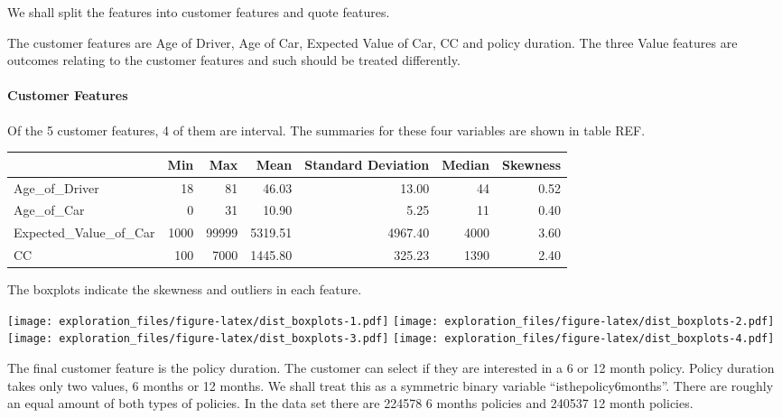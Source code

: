 

% 



We shall split the features into customer features and quote features.

The customer features are Age of Driver, Age of Car, Expected Value of
Car, CC and policy duration. The three Value features are outcomes
relating to the customer features and such should be treated
differently.

\paragraph{Customer Features}\label{customer-features}

Of the 5 customer features, 4 of them are interval. The summaries for
these four variables are shown in table REF.

\begin{longtable}[c]{@{}lrrrrrr@{}}
\toprule
& Min & Max & Mean & Standard Deviation & Median &
Skewness\tabularnewline
\midrule
\endhead
Age\_of\_Driver & 18 & 81 & 46.03 & 13.00 & 44 & 0.52\tabularnewline
Age\_of\_Car & 0 & 31 & 10.90 & 5.25 & 11 & 0.40\tabularnewline
Expected\_Value\_of\_Car & 1000 & 99999 & 5319.51 & 4967.40 & 4000 &
3.60\tabularnewline
CC & 100 & 7000 & 1445.80 & 325.23 & 1390 & 2.40\tabularnewline
\bottomrule
\end{longtable}

The boxplots indicate the skewness and outliers in each feature.

\texttt{[image: exploration\_files/figure-latex/dist\_boxplots-1.pdf]}
\texttt{[image: exploration\_files/figure-latex/dist\_boxplots-2.pdf]}
\texttt{[image: exploration\_files/figure-latex/dist\_boxplots-3.pdf]}
\texttt{[image: exploration\_files/figure-latex/dist\_boxplots-4.pdf]}

The final customer feature is the policy duration. The customer can
select if they are interested in a 6 or 12 month policy. Policy duration
takes only two values, 6 months or 12 months. We shall treat this as a
symmetric binary variable ``isthepolicy6months''. There are roughly an
equal amount of both types of policies. In the data set there are 224578
6 months policies and 240537 12 month policies.


